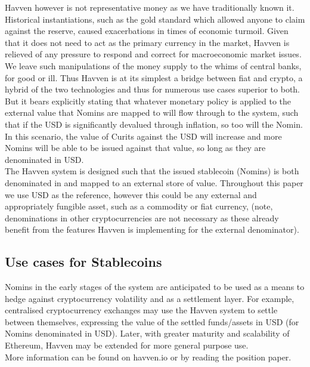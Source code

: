 \noindent Havven however is not representative money as we have traditionally known it. Historical instantiations, such as the gold standard which allowed anyone to claim against the reserve, caused exacerbations in times of economic turmoil. Given that it does not need to act as the primary currency in the market, Havven is relieved of any pressure to respond and correct for macroeconomic market issues. We leave such manipulations of the money supply to the whims of central banks, for good or ill. Thus Havven is at its simplest a bridge between fiat and crypto, a hybrid of the two technologies and thus for numerous use cases superior to both. But it bears explicitly stating that whatever monetary policy is applied to the external value that Nomins are mapped to will flow through to the system, such that if the USD is significantly devalued through inflation, so too will the Nomin. In this scenario, the value of Curits against the USD will increase and more Nomins will be able to be issued against that value, so long as they are denominated in USD. \\

\noindent The Havven system is designed such that the issued stablecoin (Nomins) is both denominated in and mapped to an external store of value. Throughout this paper we use USD as the reference, however this could be any external and appropriately fungible asset, such as a commodity or fiat currency, (note, denominations in other cryptocurrencies are not necessary as these already benefit from the features Havven is implementing for the external denominator). \\

\subsection{Use cases for Stablecoins}

\noindent Nomins in the early stages of the system are anticipated to be used as a means to hedge against cryptocurrency volatility and as a settlement layer. For example, centralised cryptocurrency exchanges may use the Havven system to settle between themselves, expressing the value of the settled funds/assets in USD (for Nomins denominated in USD). Later, with greater maturity and scalability of Ethereum, Havven may be extended for more general purpose use. \\


\noindent More information can be found on havven.io or by reading the position paper.

\pagebreak
